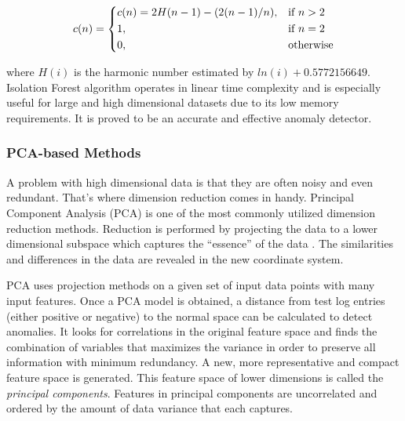  \[
 c(n) = 
  \begin{dcases}
     c(n) = 2H(n - 1) - (2(n - 1) / n), & \text{if } n > 2\\
     1, & \text{if } n = 2\\
     0, & \text{otherwise}
 \end{dcases} 
 \]
 
 where $H(i)$ is the harmonic number estimated by $ln(i) + 0.5772156649$. \\
 
 Isolation Forest algorithm operates in linear time complexity and is especially useful for large and high dimensional datasets due to its low memory requirements. It is proved to be an accurate and effective anomaly detector.
 
 
 \subsubsection{PCA-based Methods}
 A problem with high dimensional data is that they are often noisy and even redundant. That's where dimension reduction comes in handy. Principal Component Analysis (PCA) is one of the most commonly utilized dimension reduction methods. Reduction is performed by projecting the data to a lower dimensional subspace which captures the “essence” of the data \cite{murphy2013machine}. The similarities and differences in the data are revealed in the new coordinate system. 
 
 PCA uses projection methods on a given set of input data points with many input features. Once a PCA model is obtained, a distance from test log entries (either positive or negative) to the normal space can be calculated to detect anomalies. It looks for correlations in the original feature space and finds the combination of variables that maximizes the variance in order to preserve all information with minimum redundancy. A new, more representative and compact feature space is generated. This feature space of lower dimensions is called the \textit{principal components}. Features in principal components are uncorrelated and ordered by the amount of data variance that each captures.\\
 
